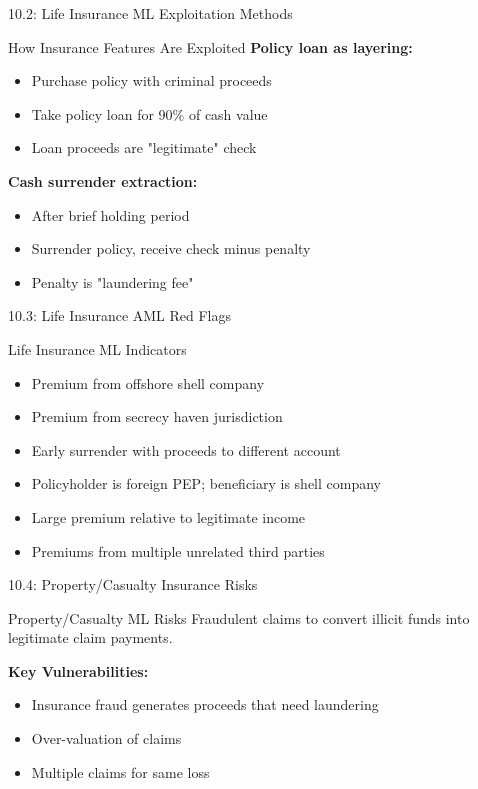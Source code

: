 \documentclass{beamer}
\begin{document}
	\begin{frame}{10.2: Life Insurance ML Exploitation Methods}
		\begin{block}{How Insurance Features Are Exploited}
			\textbf{Policy loan as layering:}
			\begin{itemize}
				\item Purchase policy with criminal proceeds
				\item Take policy loan for 90\% of cash value
				\item Loan proceeds are "legitimate" check
			\end{itemize}
			\textbf{Cash surrender extraction:}
			\begin{itemize}
				\item After brief holding period
				\item Surrender policy, receive check minus penalty
				\item Penalty is "laundering fee"
			\end{itemize}
		\end{block}
	\end{frame}
	
	\begin{frame}{10.3: Life Insurance AML Red Flags}
		\begin{block}{Life Insurance ML Indicators}
			\begin{itemize}
				\item Premium from offshore shell company
				\item Premium from secrecy haven jurisdiction
				\item Early surrender with proceeds to different account
				\item Policyholder is foreign PEP; beneficiary is shell company
				\item Large premium relative to legitimate income
				\item Premiums from multiple unrelated third parties
			\end{itemize}
		\end{block}
	\end{frame}
	
	\begin{frame}{10.4: Property/Casualty Insurance Risks}
		\begin{block}{Property/Casualty ML Risks}
			Fraudulent claims to convert illicit funds into legitimate claim payments.
		\end{block}
		\textbf{Key Vulnerabilities:}
		\begin{itemize}
			\item Insurance fraud generates proceeds that need laundering
			\item Over-valuation of claims
			\item Multiple claims for same loss
		\end{itemize}
	\end{frame}
	
\end{document}

